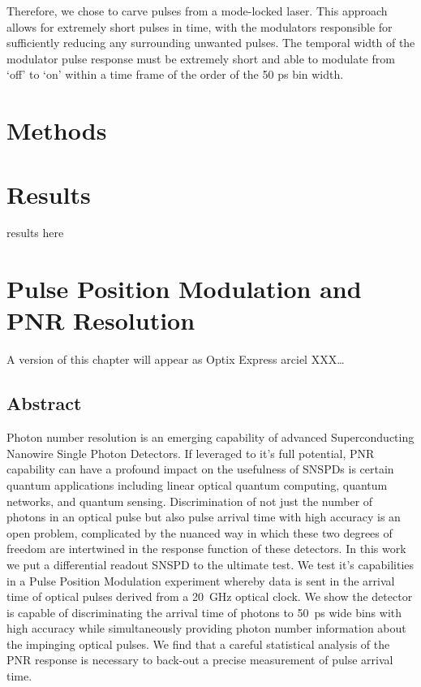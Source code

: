 \documentclass[11pt]{caltech_thesis} %
\begin{document}
Therefore, we chose to carve pulses from a mode-locked laser. This
approach allows for extremely short pulses in time, with the modulators
responsible for sufficiently reducing any surrounding unwanted pulses.
The temporal width of the modulator pulse response must be extremely
short and able to modulate from `off' to `on' within a time frame of the
order of the 50 ps bin width.

\hypertarget{methods}{%
\chapter{Methods}\label{methods}}

\hypertarget{results}{%
\chapter{Results}\label{results}}

results here

\hypertarget{pulse-position-modulation-and-pnr-resolution}{%
\chapter{Pulse Position Modulation and PNR
Resolution}\label{pulse-position-modulation-and-pnr-resolution}}

A version of this chapter will appear as Optix Express arciel
XXX\ldots{}

\hypertarget{abstract-2}{%
\section{Abstract}\label{abstract-2}}

Photon number resolution is an emerging capability of advanced
Superconducting Nanowire Single Photon Detectors. If leveraged to it's
full potential, PNR capability can have a profound impact on the
usefulness of SNSPDs is certain quantum applications including linear
optical quantum computing, quantum networks, and quantum sensing.
Discrimination of not just the number of photons in an optical pulse but
also pulse arrival time with high accuracy is an open problem,
complicated by the nuanced way in which these two degrees of freedom are
intertwined in the response function of these detectors. In this work we
put a differential readout SNSPD to the ultimate test. We test it's
capabilities in a Pulse Position Modulation experiment whereby data is
sent in the arrival time of optical pulses derived from a 20~GHz optical
clock. We show the detector is capable of discriminating the arrival
time of photons to 50~ps wide bins with high accuracy while
simultaneously providing photon number information about the impinging
optical pulses. We find that a careful statistical analysis of the PNR
response is necessary to back-out a precise measurement of pulse arrival
time.
\end{document}
